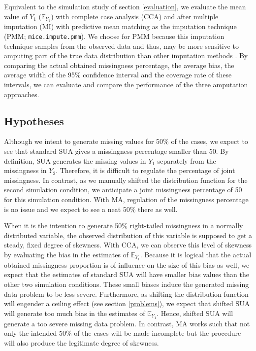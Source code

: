 \documentclass[11pt,a4paper]{article}
\newcommand{\code}[1]{\texttt{#1}}
\begin{document}
Equivalent to the simulation study of section \ref{evaluation}, we evaluate the mean value of $Y_1$ ($\mathbb{E}_{Y_1}$) with complete case analysis (CCA) and after multiple imputation (MI) with predictive mean matching as the imputation technique (PMM; \code{mice.impute.pmm}). We choose for PMM because this imputation technique samples from the observed data and thus, may be more sensitive to amputing part of the true data distribution than other imputation methods \citep{Vink2014}. By comparing the actual obtained missingness percentage, the average bias, the average width of the 95\% confidence interval and the coverage rate of these intervals, we can evaluate and compare the performance of the three amputation approaches. 

\subsection{\normalsize Hypotheses}

Although we intent to generate missing values for 50\% of the cases, we expect to see that standard SUA gives a missingness percentage smaller than 50. By definition, SUA generates the missing values in $Y_1$ separately from the missingness in $Y_2$. Therefore, it is difficult to regulate the percentage of joint missingness. In contrast, as we manually shifted the distribution function for the second simulation condition, we anticipate a joint missingness percentage of 50 for this simulation condition. With MA, regulation of the missingness percentage is no issue and we expect to see a neat 50\% there as well. 

When it is the intention to generate 50\% right-tailed missingness in a normally distributed variable, the observed distribution of this variable is supposed to get a steady, fixed degree of skewness. With CCA, we can observe this level of skewness by evaluating the bias in the estimates of $\mathbb{E}_{Y_1}$. Because it is logical that the actual obtained missingness proportion is of influence on the size of this bias as well, we expect that the estimates of standard SUA will have smaller bias values than the other two simulation conditions. These small biases induce the generated missing data problem to be less severe. Furthermore, as shifting the distribution function will engender a ceiling effect (see section \ref{problems}), we expect that shifted SUA will generate too much bias in the estimates of $\mathbb{E}_{Y_1}$. Hence, shifted SUA will generate a too severe missing data problem. In contrast, MA works such that not only the intended 50\% of the cases will be made incomplete but the procedure will also produce the legitimate degree of skewness.
\end{document}
